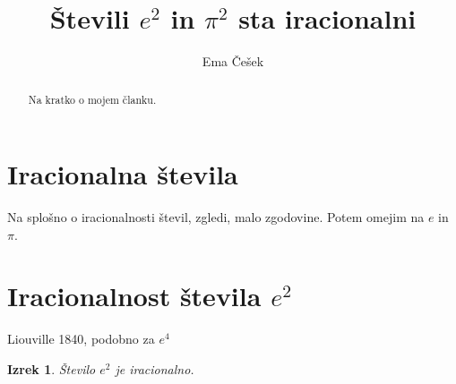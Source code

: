 \documentclass[a4paper]{article}
\theoremstyle{plain}
\newtheorem{izrek}{Izrek}
\begin{document}
\title{\textbf{Števili $e^2$ in $\pi^2$ sta iracionalni}}
\author{Ema Češek}
\date{}
\maketitle
\thispagestyle{empty} %

\begin{abstract}
Na kratko o mojem članku.
\end{abstract}

\section*{Iracionalna števila}
Na splošno o iracionalnosti števil, zgledi, malo zgodovine. Potem omejim na $e$ in $\pi$.

\section*{Iracionalnost števila $e^2$}
Liouville 1840, podobno za $e^4$

\begin{izrek}
Število $e^2$ je iracionalno.
\end{izrek}
\end{document}
